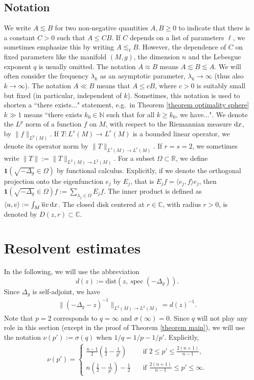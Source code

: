 \documentclass[12pt]{amsart}
\newcommand{\rd}{{\rm d}}
\newcommand{\N}{{\mathbb N}}
\newcommand{\R}{{\mathbb R}}
\newcommand{\C}{{\mathbb C}}
\newcommand{\dist}{\mathrm{dist}}
\DeclareMathOperator{\spec}{spec}
\begin{document}
\subsection*{Notation} 
We write $A\lesssim B$ for two non-negative quantities $A,B\geq 0$ to indicate
that there is a constant $C>0$ such that $A\leq C B$. If $C$ depends on a list of parameters $\ell$, we sometimes emphasize this by writing $A\lesssim_{\ell} B$. However, the dependence of $C$ on fixed parameters like the manifold $(M,g)$, the dimension $n$ and the Lebesgue exponent $q$ is usually omitted. The notation $A\approx B$ means $A\lesssim B\lesssim A$. We will often consider the frequency $\lambda_k$ as an asymptotic parameter, $\lambda_k\to\infty$ (thus also $k\to \infty$). The notation $A\ll B$ means that $A\leq c B$, where $c>0$ is suitably small but fixed (in particular, independent of $k$). Sometimes, this notation is used to shorten a ``there exists..." statement, e.g.\ in Theorem \ref{theorem optimality sphere} $k\gg 1$ means ``there exists $k_0\in \N$ such that for all $k\geq k_0$, we have...". 
We denote the $L^p$ norm of a function $f$ on $M$, with respect to the Riemannian measure $\rd x$, by $\|f\|_{L^p(M)}$. If $T:L^s(M)\to L^r(M)$ is a bounded linear operator, we denote its operator norm by $\|T\|_{L^s(M)\to L^r(M)}$. If $r=s=2$, we sometimes write $\|T\|:=\|T\|_{L^2(M)\to L^2(M)}$.
For a subset $\Omega\subset \R$, we define $\mathbf{1}(\sqrt{-\Delta_g}\in \Omega)$ by functional calculus. Explicitly, if we denote the orthogonal projection onto the eigenfunction $e_j$ by $E_j$, that is $E_jf=\langle e_j,f\rangle e_j$, then $\mathbf{1}(\sqrt{-\Delta_g}\in \Omega)f:=\sum_{\lambda_j\in\Omega}E_jf$. The inner product is defined as $\langle u,v\rangle:=\int_M \overline{u}v\,\rd x$. 
The closed disk centered at $r\in\C$, with radius $r>0$, is denoted by $D(z,r)\subset \C$. 

\section{Resolvent estimates}\label{Section Resolvent estimates}
In the following, we will use the abbreviation $$d(z):=\dist(z,\spec(-\Delta_g)).$$
Since $\Delta_g$ is self-adjoint, we have 
\begin{align}\label{trivial L2-L2 bound}
    \|(-\Delta_g-z)^{-1}\|_{L^{2}(M)\to L^{2}(M)}= d(z)^{-1}.
\end{align}
Note that $p=2$ corresponds to $q=\infty$ and $\sigma(\infty)=0$. Since $q$ will not play any role in this section (except in the proof of Theorem \ref{theorem main}), we will use the notation $\nu(p'):=\sigma(q)$ when $1/q=1/p-1/p'$. Explicitly,
\begin{align}\label{def. nu(p')}
    \nu(p')=\begin{cases}
        \frac{n-1}{2}(\frac{1}{2}-\frac{1}{p'})\quad &\mbox{if } 2\leq p'\leq \frac{2(n+1)}{n-1},\\
        n(\frac{1}{2}-\frac{1}{p'})-\frac{1}{2}\quad &\mbox{if } \frac{2(n+1)}{n-1}\leq  p'\leq \infty.
    \end{cases}   
\end{align}
\end{document}

